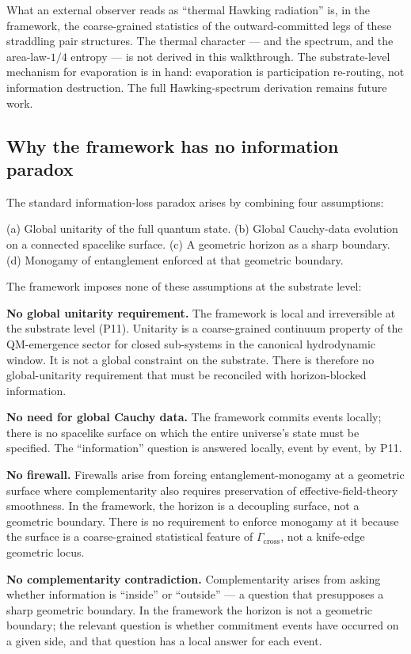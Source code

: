 \documentclass[11pt,a4paper]{article}
\begin{document}
What an external observer reads as ``thermal Hawking radiation'' is, in the framework, the coarse-grained statistics of the outward-committed legs of these straddling pair structures. The thermal character --- and the spectrum, and the area-law-$1/4$ entropy --- is not derived in this walkthrough. The substrate-level mechanism for evaporation is in hand: evaporation is participation re-routing, not information destruction. The full Hawking-spectrum derivation remains future work.

\subsection{Why the framework has no information paradox}

The standard information-loss paradox arises by combining four assumptions:

(a) Global unitarity of the full quantum state. (b) Global Cauchy-data evolution on a connected spacelike surface. (c) A geometric horizon as a sharp boundary. (d) Monogamy of entanglement enforced at that geometric boundary.

The framework imposes none of these assumptions at the substrate level:

\textbf{No global unitarity requirement.} The framework is local and irreversible at the substrate level (P11). Unitarity is a coarse-grained continuum property of the QM-emergence sector for closed sub-systems in the canonical hydrodynamic window. It is not a global constraint on the substrate. There is therefore no global-unitarity requirement that must be reconciled with horizon-blocked information.

\textbf{No need for global Cauchy data.} The framework commits events locally; there is no spacelike surface on which the entire universe's state must be specified. The ``information'' question is answered locally, event by event, by P11.

\textbf{No firewall.} Firewalls arise from forcing entanglement-monogamy at a geometric surface where complementarity also requires preservation of effective-field-theory smoothness. In the framework, the horizon is a decoupling surface, not a geometric boundary. There is no requirement to enforce monogamy at it because the surface is a coarse-grained statistical feature of $\Gamma_{\mathrm{cross}}$, not a knife-edge geometric locus.

\textbf{No complementarity contradiction.} Complementarity arises from asking whether information is ``inside'' or ``outside'' --- a question that presupposes a sharp geometric boundary. In the framework the horizon is not a geometric boundary; the relevant question is whether commitment events have occurred on a given side, and that question has a local answer for each event.
\end{document}
